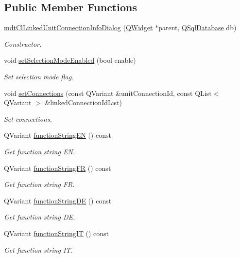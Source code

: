 \subsection*{Public Member Functions}
\begin{DoxyCompactItemize}
\item 
\hyperlink{classmdt_cl_linked_unit_connection_info_dialog_a435b36e611f1aecefe3b9fb8f33d77bc}{mdt\-Cl\-Linked\-Unit\-Connection\-Info\-Dialog} (\hyperlink{class_q_widget}{Q\-Widget} $\ast$parent, \hyperlink{class_q_sql_database}{Q\-Sql\-Database} db)
\begin{DoxyCompactList}\small\item\em Constructor. \end{DoxyCompactList}\item 
void \hyperlink{classmdt_cl_linked_unit_connection_info_dialog_a480970265fe1b2e8cfeee594ee617f64}{set\-Selection\-Mode\-Enabled} (bool enable)
\begin{DoxyCompactList}\small\item\em Set selection mode flag. \end{DoxyCompactList}\item 
void \hyperlink{classmdt_cl_linked_unit_connection_info_dialog_a0174bb7aa7a5c1d3affc965df9d21cba}{set\-Connections} (const Q\-Variant \&unit\-Connection\-Id, const Q\-List$<$ Q\-Variant $>$ \&linked\-Connection\-Id\-List)
\begin{DoxyCompactList}\small\item\em Set connections. \end{DoxyCompactList}\item 
Q\-Variant \hyperlink{classmdt_cl_linked_unit_connection_info_dialog_a2b7b389c4f91ee1f07a1b8befcfd5acb}{function\-String\-E\-N} () const 
\begin{DoxyCompactList}\small\item\em Get function string E\-N. \end{DoxyCompactList}\item 
Q\-Variant \hyperlink{classmdt_cl_linked_unit_connection_info_dialog_aa2a76f39337cef29b506d6bb588b6496}{function\-String\-F\-R} () const 
\begin{DoxyCompactList}\small\item\em Get function string F\-R. \end{DoxyCompactList}\item 
Q\-Variant \hyperlink{classmdt_cl_linked_unit_connection_info_dialog_ab2685a6494d758d7ea4c12e0d53281d6}{function\-String\-D\-E} () const 
\begin{DoxyCompactList}\small\item\em Get function string D\-E. \end{DoxyCompactList}\item 
Q\-Variant \hyperlink{classmdt_cl_linked_unit_connection_info_dialog_a322cc8a65ce3de322066fd6e636b7466}{function\-String\-I\-T} () const 
\begin{DoxyCompactList}\small\item\em Get function string I\-T. \end{DoxyCompactList}\end{DoxyCompactItemize}


